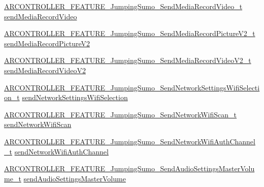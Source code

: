 \begin{DoxyCompactItemize}
\item 
\hyperlink{_a_r_c_o_n_t_r_o_l_l_e_r___feature_8h_a9f7de26f978d74391c9ebfc7f366c8f9}{A\+R\+C\+O\+N\+T\+R\+O\+L\+L\+E\+R\+\_\+\+F\+E\+A\+T\+U\+R\+E\+\_\+\+Jumping\+Sumo\+\_\+\+Send\+Media\+Record\+Video\+\_\+t} \hyperlink{struct_a_r_c_o_n_t_r_o_l_l_e_r___f_e_a_t_u_r_e___jumping_sumo__t_ac4377ec5266e35c6759f2518e7f5193f}{send\+Media\+Record\+Video}
\item 
\hyperlink{_a_r_c_o_n_t_r_o_l_l_e_r___feature_8h_a60f05ed24720133bfa05108e87a89d6b}{A\+R\+C\+O\+N\+T\+R\+O\+L\+L\+E\+R\+\_\+\+F\+E\+A\+T\+U\+R\+E\+\_\+\+Jumping\+Sumo\+\_\+\+Send\+Media\+Record\+Picture\+V2\+\_\+t} \hyperlink{struct_a_r_c_o_n_t_r_o_l_l_e_r___f_e_a_t_u_r_e___jumping_sumo__t_a0b6fa5048e7e885b579539b92c85a09e}{send\+Media\+Record\+Picture\+V2}
\item 
\hyperlink{_a_r_c_o_n_t_r_o_l_l_e_r___feature_8h_ae2a61ba134c50af4579ff50817d9a4e1}{A\+R\+C\+O\+N\+T\+R\+O\+L\+L\+E\+R\+\_\+\+F\+E\+A\+T\+U\+R\+E\+\_\+\+Jumping\+Sumo\+\_\+\+Send\+Media\+Record\+Video\+V2\+\_\+t} \hyperlink{struct_a_r_c_o_n_t_r_o_l_l_e_r___f_e_a_t_u_r_e___jumping_sumo__t_a0f4d1c2a03a4adc796e9e4dbe726b700}{send\+Media\+Record\+Video\+V2}
\item 
\hyperlink{_a_r_c_o_n_t_r_o_l_l_e_r___feature_8h_a62d477dfd1ed69bd3e480fbfa0db50f7}{A\+R\+C\+O\+N\+T\+R\+O\+L\+L\+E\+R\+\_\+\+F\+E\+A\+T\+U\+R\+E\+\_\+\+Jumping\+Sumo\+\_\+\+Send\+Network\+Settings\+Wifi\+Selection\+\_\+t} \hyperlink{struct_a_r_c_o_n_t_r_o_l_l_e_r___f_e_a_t_u_r_e___jumping_sumo__t_a04ec4ffe252d45ec4a870b596edabd95}{send\+Network\+Settings\+Wifi\+Selection}
\item 
\hyperlink{_a_r_c_o_n_t_r_o_l_l_e_r___feature_8h_a97b28ed5f2ebb4a6ef3528650f0620af}{A\+R\+C\+O\+N\+T\+R\+O\+L\+L\+E\+R\+\_\+\+F\+E\+A\+T\+U\+R\+E\+\_\+\+Jumping\+Sumo\+\_\+\+Send\+Network\+Wifi\+Scan\+\_\+t} \hyperlink{struct_a_r_c_o_n_t_r_o_l_l_e_r___f_e_a_t_u_r_e___jumping_sumo__t_a61f7be9156f15325d524ed643af0de7d}{send\+Network\+Wifi\+Scan}
\item 
\hyperlink{_a_r_c_o_n_t_r_o_l_l_e_r___feature_8h_a542d52600da2c936bb39017b29e94535}{A\+R\+C\+O\+N\+T\+R\+O\+L\+L\+E\+R\+\_\+\+F\+E\+A\+T\+U\+R\+E\+\_\+\+Jumping\+Sumo\+\_\+\+Send\+Network\+Wifi\+Auth\+Channel\+\_\+t} \hyperlink{struct_a_r_c_o_n_t_r_o_l_l_e_r___f_e_a_t_u_r_e___jumping_sumo__t_a90d5cb0251523746c9cbc90771174a33}{send\+Network\+Wifi\+Auth\+Channel}
\item 
\hyperlink{_a_r_c_o_n_t_r_o_l_l_e_r___feature_8h_a999610520cdb67b9b31a9dd79de05148}{A\+R\+C\+O\+N\+T\+R\+O\+L\+L\+E\+R\+\_\+\+F\+E\+A\+T\+U\+R\+E\+\_\+\+Jumping\+Sumo\+\_\+\+Send\+Audio\+Settings\+Master\+Volume\+\_\+t} \hyperlink{struct_a_r_c_o_n_t_r_o_l_l_e_r___f_e_a_t_u_r_e___jumping_sumo__t_adf24768ed25227e3a4d220b2345a484f}{send\+Audio\+Settings\+Master\+Volume}

\end{DoxyCompactItemize}
